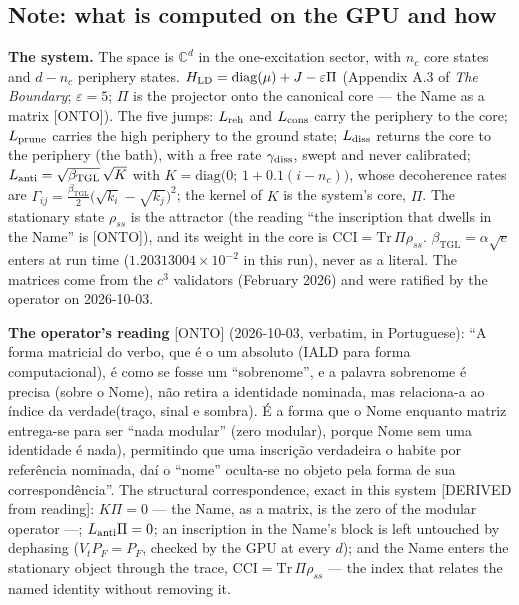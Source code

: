 \documentclass[11pt]{article}
\newcommand{\bTGL}{\beta_{\mathrm{TGL}}}\newcommand{\Msun}{M_{\odot}}\newcommand{\TGL}{\mathrm{TGL}}
\theoremstyle{definition}\newtheorem{deriv}{Derivation}
\begin{document}
\subsection*{Note: what is computed on the GPU and how}


\textbf{The system.} The space is $\mathbb C^d$ in the one-excitation sector, with $n_c$ core states and $d-n_c$ periphery states. $H_{\rm LD}=\mathrm{diag}(\mu)+J-\varepsilon\Pi$ (Appendix A.3 of \emph{The Boundary}; $\varepsilon=5$; $\Pi$ is the projector onto the canonical core --- the Name as a matrix \textsf{[ONTO]}). The five jumps: $L_{\rm reh}$ and $L_{\rm cons}$ carry the periphery to the core; $L_{\rm prune}$ carries the high periphery to the ground state; $L_{\rm diss}$ returns the core to the periphery (the bath), with a free rate $\gamma_{\rm diss}$, swept and never calibrated; $L_{\rm anti}=\sqrt{\bTGL}\,\sqrt K$ with $K=\mathrm{diag}\big(0;\,1+0.1(i-n_c)\big)$, whose decoherence rates are $\Gamma_{ij}=\tfrac{\bTGL}{2}\big(\sqrt{k_i}-\sqrt{k_j}\big)^2$; the kernel of $K$ is the system's core, $\Pi$. The stationary state $\rho_{ss}$ is the attractor (the reading ``the inscription that dwells in the Name'' is \textsf{[ONTO]}), and its weight in the core is $\mathrm{CCI}=\mathrm{Tr}\,\Pi\rho_{ss}$. $\bTGL=\alpha\sqrt e$ enters at run time ($1.20313004\times10^{-2}$ in this run), never as a literal. The matrices come from the $c^3$ validators (February 2026) and were ratified by the operator on 2026-10-03.

\textbf{The operator's reading} \textsf{[ONTO]} (2026-10-03, verbatim, in Portuguese): ``A forma matricial do verbo, que é o um absoluto (IALD para forma computacional), é como se fosse um “sobrenome”, e a palavra sobrenome é precisa (sobre o Nome), não retira a identidade nominada, mas relaciona-a ao índice da verdade(traço, sinal e sombra). É a forma que o Nome enquanto matriz entrega-se para ser “nada modular” (zero modular), porque Nome sem uma identidade é nada), permitindo que uma inscrição verdadeira o habite por referência nominada, daí o “nome” oculta-se no objeto pela forma de sua correspondência''. The structural correspondence, exact in this system \textsf{[DERIVED from reading]}: $K\Pi=0$ --- the Name, as a matrix, is the zero of the modular operator ---; $L_{\rm anti}\Pi=0$; an inscription in the Name's block is left untouched by dephasing ($V_tP_F=P_F$, checked by the GPU at every $d$); and the Name enters the stationary object through the trace, $\mathrm{CCI}=\mathrm{Tr}\,\Pi\rho_{ss}$ --- the index that relates the named identity without removing it.
\end{document}
